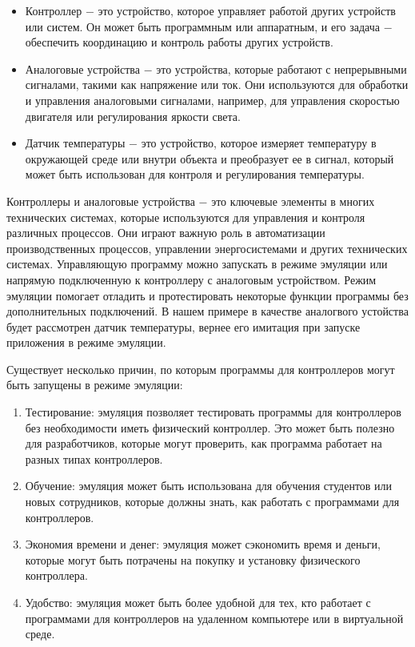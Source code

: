\begin{itemize}
    \item Контроллер $-$ это устройство, которое управляет работой других устройств или систем. Он может быть программным или аппаратным, и его задача $-$ обеспечить координацию и контроль работы других устройств.
    \item Аналоговые устройства $-$ это устройства, которые работают с непрерывными сигналами, такими как напряжение или ток. Они используются для обработки и управления аналоговыми сигналами, например, для управления скоростью двигателя или регулирования яркости света.
    \item Датчик температуры $-$ это устройство, которое измеряет температуру в окружающей среде или внутри объекта и преобразует ее в сигнал, который может быть использован для контроля и регулирования температуры.
\end{itemize}

Контроллеры и аналоговые устройства $-$ это ключевые элементы в многих технических системах, которые используются для управления и контроля различных процессов. Они играют важную роль в автоматизации производственных процессов, управлении энергосистемами и других технических системах. Управляющую программу можно запускать в режиме эмуляции или напрямую подключенную к контроллеру с аналоговым устройством. Режим эмуляции помогает отладить и протестировать некоторые функции программы без дополнительных подключений. В нашем примере в качестве аналогвого устойства будет рассмотрен датчик температуры, вернее его имитация при запуске приложения в режиме эмуляции.

Существует несколько причин, по которым программы для контроллеров могут быть запущены в режиме эмуляции:

\begin{enumerate}
    \item Тестирование: эмуляция позволяет тестировать программы для контроллеров без необходимости иметь физический контроллер. Это может быть полезно для разработчиков, которые могут проверить, как программа работает на разных типах контроллеров.
    \item Обучение: эмуляция может быть использована для обучения студентов или новых сотрудников, которые должны знать, как работать с программами для контроллеров.
    \item Экономия времени и денег: эмуляция может сэкономить время и деньги, которые могут быть потрачены на покупку и установку физического контроллера.
    \item Удобство: эмуляция может быть более удобной для тех, кто работает с программами для контроллеров на удаленном компьютере или в виртуальной среде.
\end{enumerate}

